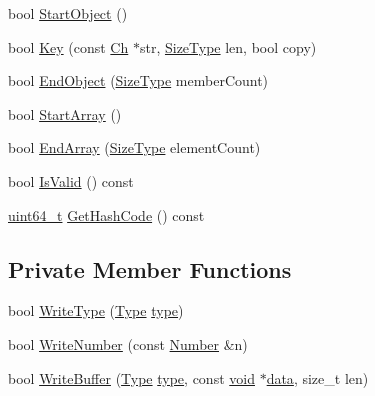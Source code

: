 \begin{DoxyCompactItemize}
\item 
bool \hyperlink{classinternal_1_1Hasher_a1607d6cac3daab9725e442e38d121028}{Start\+Object} ()
\item 
bool \hyperlink{classinternal_1_1Hasher_a1b34d88f85f9c6a739c1f9038f14f078}{Key} (const \hyperlink{classinternal_1_1Hasher_a415970af68a067615c3c95306cff6d43}{Ch} $\ast$str, \hyperlink{rapidjson_8h_a5ed6e6e67250fadbd041127e6386dcb5}{Size\+Type} len, bool copy)
\item 
bool \hyperlink{classinternal_1_1Hasher_a7050f1552d88967944195163a6a0b08e}{End\+Object} (\hyperlink{rapidjson_8h_a5ed6e6e67250fadbd041127e6386dcb5}{Size\+Type} member\+Count)
\item 
bool \hyperlink{classinternal_1_1Hasher_a2ceb3cc00216f6b6ce66907856a16404}{Start\+Array} ()
\item 
bool \hyperlink{classinternal_1_1Hasher_ad445b2730be23e18b4dec2c4d1033419}{End\+Array} (\hyperlink{rapidjson_8h_a5ed6e6e67250fadbd041127e6386dcb5}{Size\+Type} element\+Count)
\item 
bool \hyperlink{classinternal_1_1Hasher_ae09fee05c56194031e8af94a1b1be145}{Is\+Valid} () const
\item 
\hyperlink{stdint_8h_aec6fcb673ff035718c238c8c9d544c47}{uint64\+\_\+t} \hyperlink{classinternal_1_1Hasher_ac221aaaa0d643aae553125e76aed7b47}{Get\+Hash\+Code} () const
\end{DoxyCompactItemize}
\subsection*{Private Member Functions}
\begin{DoxyCompactItemize}
\item 
bool \hyperlink{classinternal_1_1Hasher_af104a27e689e3771872cbf271dc34914}{Write\+Type} (\hyperlink{rapidjson_8h_a1d1cfd8ffb84e947f82999c682b666a7}{Type} \hyperlink{imgui__impl__opengl3__loader_8h_a63267399cd2a2ee217572c11d2e54f07}{type})
\item 
bool \hyperlink{classinternal_1_1Hasher_abf8802d137174e04ec9975fbbf1075e1}{Write\+Number} (const \hyperlink{structinternal_1_1Hasher_1_1Number}{Number} \&n)
\item 
bool \hyperlink{classinternal_1_1Hasher_a028d5bf406cea4ae85678f454aacc6ee}{Write\+Buffer} (\hyperlink{rapidjson_8h_a1d1cfd8ffb84e947f82999c682b666a7}{Type} \hyperlink{imgui__impl__opengl3__loader_8h_a63267399cd2a2ee217572c11d2e54f07}{type}, const \hyperlink{imgui__impl__opengl3__loader_8h_ac668e7cffd9e2e9cfee428b9b2f34fa7}{void} $\ast$\hyperlink{imgui__impl__opengl3__loader_8h_abd87654504355b4c1bb002dcb1d4d16a}{data}, size\+\_\+t len)
\end{DoxyCompactItemize}
